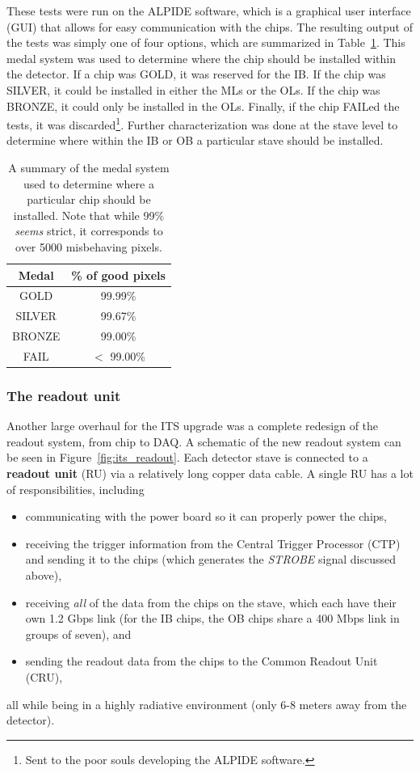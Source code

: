 These tests were run on the ALPIDE software, which is a graphical user interface (GUI) that allows for easy communication with the chips. The resulting output of the tests was simply one of four options, which are summarized in Table~\ref{tab:chip_medals}. This medal system was used to determine where the chip should be installed within the detector. If a chip was GOLD, it was reserved for the IB. If the chip was SILVER, it could be installed in either the MLs or the OLs. If the chip was BRONZE, it could only be installed in the OLs. Finally, if the chip FAILed the tests, it was discarded\footnote{Sent to the poor souls developing the ALPIDE software.}. Further characterization was done at the stave level to determine where within the IB or OB a particular stave should be installed.

\begin{table}
    \centering
    \caption{A summary of the medal system used to determine where a particular chip should be installed. Note that while 99\% \textit{seems} strict, it corresponds to over 5000 misbehaving pixels.}
    \begin{tabular}{|c|c|}
        \hline
        \textbf{Medal} & \textbf{\% of good pixels} \\
        \hline
        GOLD & 99.99\% \\
        SILVER & 99.67\% \\
        BRONZE & 99.00\% \\
        FAIL &  $<$ 99.00\% \\
        \hline
    \end{tabular}
    \label{tab:chip_medals}
\end{table}

\subsubsection{The readout unit}
Another large overhaul for the ITS upgrade was a complete redesign of the readout system, from chip to DAQ. A schematic of the new readout system can be seen in Figure~\ref{fig:its_readout}. Each detector stave is connected to a \textbf{readout unit} (RU) via a relatively long copper data cable. A single RU has a lot of responsibilities, including
\begin{itemize}
    \item communicating with the power board so it can properly power the chips,
    \item receiving the trigger information from the Central Trigger Processor (CTP) and sending it to the chips (which generates the \textit{STROBE} signal discussed above),
    \item receiving \textit{all} of the data from the chips on the stave, which each have their own 1.2 Gbps link (for the IB chips, the OB chips share a 400 Mbps link in groups of seven), and
    \item sending the readout data from the chips to the Common Readout Unit (CRU), 
\end{itemize}
all while being in a highly radiative environment (only 6-8 meters away from the detector). 

